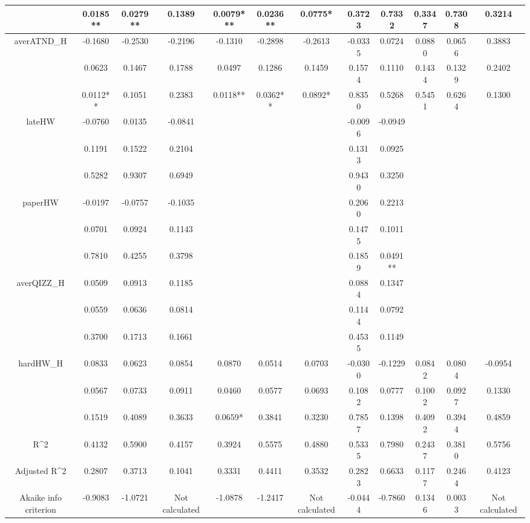 \documentclass[]{article}
\begin{document}
\begin{landscape}
\begin{table}[htp]
\begin{adjustbox}{height=0.5\textheight,width=1.6\textwidth}
\begin{tabular}{c|ccc|ccc|cc|ccc}
				& 0.0185** & 0.0279** & 0.1389 & 0.0079*** & 0.0236** & 0.0775* & 0.3723 & 0.7332 & 0.3347 & 0.7308 & 0.3214 \\
				\hline
				averATND\_H & -0.1680 & -0.2530 & -0.2196 & -0.1310 & -0.2898 & -0.2613 & -0.0335 & 0.0724 & 0.0880 & 0.0656 & 0.3883 \\
				& 0.0623 & 0.1467 & 0.1788 & 0.0497 & 0.1286 & 0.1459 & 0.1574 & 0.1110 & 0.1434 & 0.1329 & 0.2402 \\
				& 0.0112** & 0.1051 & 0.2383 & 0.0118** & 0.0362** & 0.0892* & 0.8350 & 0.5268 & 0.5451 & 0.6264 & 0.1300 \\
				lateHW & -0.0760 & 0.0135 & -0.0841 &  &  &  & -0.0096 & -0.0949 &  &  &  \\
				& 0.1191 & 0.1522 & 0.2104 &  &  &  & 0.1313 & 0.0925 &  &  &  \\
				& 0.5282 & 0.9307 & 0.6949 &  &  &  & 0.9430 & 0.3250 &  &  &  \\
				paperHW & -0.0197 & -0.0757 & -0.1035 &  &  &  & 0.2060 & 0.2213 &  &  &  \\
				& 0.0701 & 0.0924 & 0.1143 &  &  &  & 0.1475 & 0.1011 &  &  &  \\
				& 0.7810 & 0.4255 & 0.3798 &  &  &  & 0.1859 & 0.0491** &  &  &  \\
				averQIZZ\_H & 0.0509 & 0.0913 & 0.1185 &  &  &  & 0.0884 & 0.1347 &  &  &  \\
				& 0.0559 & 0.0636 & 0.0814 &  &  &  & 0.1144 & 0.0792 &  &  &  \\
				& 0.3700 & 0.1713 & 0.1661 &  &  &  & 0.4535 & 0.1149 &  &  &  \\
				hardHW\_H & 0.0833 & 0.0623 & 0.0854 & 0.0870 & 0.0514 & 0.0703 & -0.0300 & -0.1229 & 0.0842 & 0.0804 & -0.0954 \\
				& 0.0567 & 0.0733 & 0.0911 & 0.0460 & 0.0577 & 0.0693 & 0.1082 & 0.0777 & 0.1002 & 0.0927 & 0.1330 \\
				& 0.1519 & 0.4089 & 0.3633 & 0.0659* & 0.3841 & 0.3230 & 0.7857 & 0.1398 & 0.4092 & 0.3944 & 0.4859 \\
				\hline
				R\^{}2 & 0.4132 & 0.5900 & 0.4157 & 0.3924 & 0.5575 & 0.4880 & 0.5335 & 0.7980 & 0.2437 & 0.3810 & 0.5756 \\
				Adjusted R\^{}2 & 0.2807 & 0.3713 & 0.1041 & 0.3331 & 0.4411 & 0.3532 & 0.2823 & 0.6633 & 0.1177 & 0.2464 & 0.4123 \\
				Akaike info criterion & -0.9083 & -1.0721 & Not calculated & -1.0878 & -1.2417 & Not calculated & -0.0444 & -0.7860 & 0.1346 & 0.0033 & Not calculated \\

\end{tabular}
\end{adjustbox}
\end{table}
\end{landscape}
\end{document}
